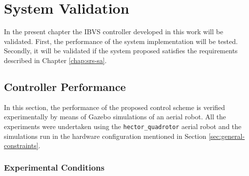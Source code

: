 
\chapter{System Validation}
\label{chap:system-validation}

In the present chapter the IBVS controller developed in this work will be validated. First, the performance of the system implementation will be tested.  Secondly, it will be validated if the system proposed satisfies the requirements described in Chapter \ref{chap:srs-sa}.

\section{Controller Performance}
\label{sec:controller-performance}

In this section, the performance of the proposed control scheme is verified experimentally by means of Gazebo simulations of an aerial robot. All the experiments were undertaken using the \texttt{hector\_quadrotor} aerial robot and the simulations run in the hardware configuration mentioned in Section \ref{sec:general-constraints}.

\subsection{Experimental Conditions}
\label{sec:experimental-conditions}

